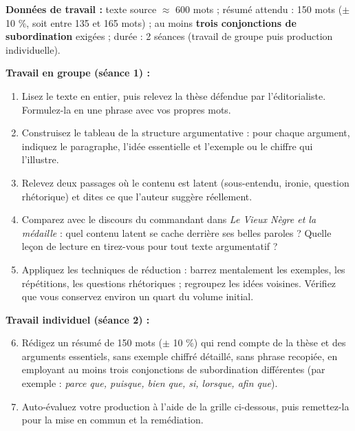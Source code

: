 \documentclass[11pt]{article}
\newcommand{\cle}[1]{{\popxbold\color{popdark}#1}}
\newcounter{popsec}
\newcounter{popsub}
\newcommand{\courssub}[1]{%
  \stepcounter{popsub}%
  \par\vspace{9pt}\noindent{\popxbold\fontsize{11.5}{13}\selectfont\color{popink}{\color{poporange}\thepopsec.\thepopsub}\hspace{6pt}#1}\par\nopagebreak\vspace{4pt}
}
\begin{document}
\textbf{Données de travail :} texte source $\approx$ 600 mots ; résumé attendu : 150 mots ($\pm$ 10 \%, soit entre 135 et 165 mots) ; au moins \textbf{trois conjonctions de subordination} exigées ; durée : 2 séances (travail de groupe puis production individuelle).

\courssub{Consignes}

\textbf{Travail en groupe (séance 1) :}

\begin{enumerate}
\item Lisez le texte en entier, puis relevez la \cle{thèse} défendue par l'éditorialiste. Formulez-la en une phrase avec vos propres mots.
\item Construisez le tableau de la structure argumentative : pour chaque argument, indiquez le paragraphe, l'idée essentielle et l'exemple ou le chiffre qui l'illustre.
\item Relevez deux passages où le contenu est \cle{latent} (sous-entendu, ironie, question rhétorique) et dites ce que l'auteur suggère réellement.
\item Comparez avec le discours du commandant dans \emph{Le Vieux Nègre et la médaille} : quel contenu latent se cache derrière ses belles paroles ? Quelle leçon de lecture en tirez-vous pour tout texte argumentatif ?
\item Appliquez les techniques de réduction : barrez mentalement les exemples, les répétitions, les questions rhétoriques ; regroupez les idées voisines. Vérifiez que vous conservez environ un quart du volume initial.
\end{enumerate}

\textbf{Travail individuel (séance 2) :}

\begin{enumerate}
\setcounter{enumi}{5}
\item Rédigez un résumé de 150 mots ($\pm$ 10 \%) qui rend compte de la thèse et des arguments essentiels, sans exemple chiffré détaillé, sans phrase recopiée, en employant au moins trois conjonctions de subordination différentes (par exemple : \emph{parce que, puisque, bien que, si, lorsque, afin que}).
\item Auto-évaluez votre production à l'aide de la grille ci-dessous, puis remettez-la pour la mise en commun et la remédiation.
\end{enumerate}
\end{document}
